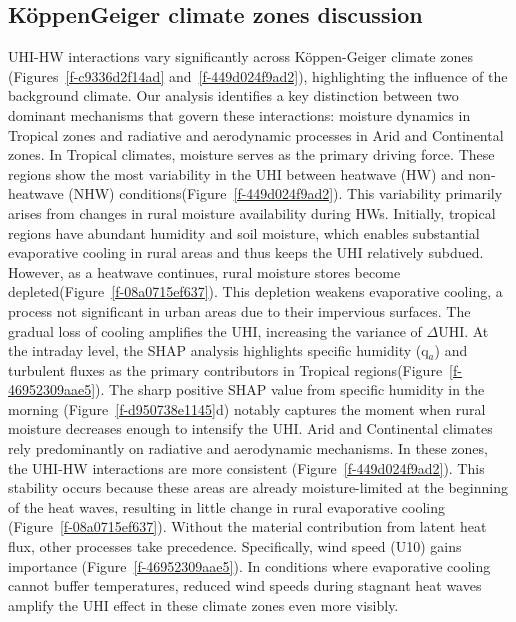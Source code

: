 \subsection*{K{\"{o}}ppen{\textendash}Geiger climate zones discussion}UHI-HW interactions vary significantly across K{\"{o}}ppen-Geiger climate zones (Figures~\ref{f-c9336d2f14ad} and~\ref{f-449d024f9ad2}), highlighting the influence of the background climate. Our analysis identifies a key distinction between two dominant mechanisms that govern these interactions: moisture dynamics in Tropical zones and radiative and aerodynamic processes in Arid and Continental zones. \mbox{}\protect\newline In Tropical climates, moisture serves as the primary driving force. These regions show the most variability in the UHI between heatwave (HW) and non-heatwave (NHW) conditions(Figure~\ref{f-449d024f9ad2}). This variability primarily arises from changes in rural moisture availability during HWs. Initially, tropical regions have abundant humidity and soil moisture, which enables substantial evaporative cooling in rural areas and thus keeps the UHI relatively subdued. However, as a heatwave continues, rural moisture stores become depleted(Figure~\ref{f-08a0715ef637}). This depletion weakens evaporative cooling, a process not significant in urban areas due to their impervious surfaces. The gradual loss of cooling amplifies the UHI, increasing the variance of \ensuremath{\Delta }UHI. At the intraday level, the SHAP analysis highlights specific humidity (q\ensuremath{_{a}}) and turbulent fluxes as the primary contributors in Tropical regions(Figure~\ref{f-46952309aae5}). The sharp positive SHAP value from specific humidity in the morning (Figure~\ref{f-d950738e1145}d) notably captures the moment when rural moisture decreases enough to intensify the UHI. \mbox{}\protect\newline Arid and Continental climates rely predominantly on radiative and aerodynamic mechanisms. In these zones, the UHI-HW interactions are more consistent (Figure~\ref{f-449d024f9ad2}). This stability occurs because these areas are already moisture-limited at the beginning of the heat waves, resulting in little change in rural evaporative cooling (Figure~\ref{f-08a0715ef637}). Without the material contribution from latent heat flux, other processes take precedence. Specifically, wind speed (U10) gains importance (Figure~\ref{f-46952309aae5}). In conditions where evaporative cooling cannot buffer temperatures, reduced wind speeds during stagnant heat waves amplify the UHI effect in these climate zones even more visibly.

